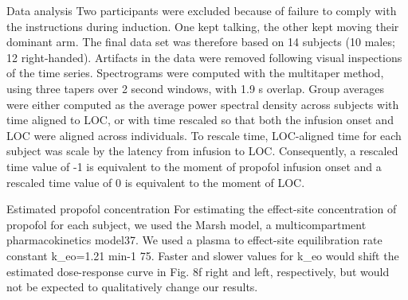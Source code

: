 Data analysis
Two participants were excluded because of failure to comply with the instructions during induction. One kept talking, the other kept moving their dominant arm. The final data set was therefore based on 14 subjects (10 males; 12 right-handed). Artifacts in the data were removed following visual inspections of the time series. Spectrograms were computed with the multitaper method, using three tapers over 2 second windows, with 1.9 s overlap. Group averages were either computed as the average power spectral density across subjects with time aligned to LOC, or with time rescaled so that both the infusion onset and LOC were aligned across individuals. To rescale time, LOC-aligned time for each subject was scale by the latency from infusion to LOC. Consequently, a rescaled time value of -1 is equivalent to the moment of propofol infusion onset and a rescaled time value of 0 is equivalent to the moment of LOC. 

Estimated propofol concentration
For estimating the effect-site concentration of propofol for each subject, we used the Marsh model, a multicompartment pharmacokinetics model37. We used a plasma to effect-site equilibration rate constant k_{eo}=1.21 min-1 75. Faster and slower values for k_{eo} would shift the estimated dose-response curve in Fig. 8f right and left, respectively, but would not be expected to qualitatively change our results.

